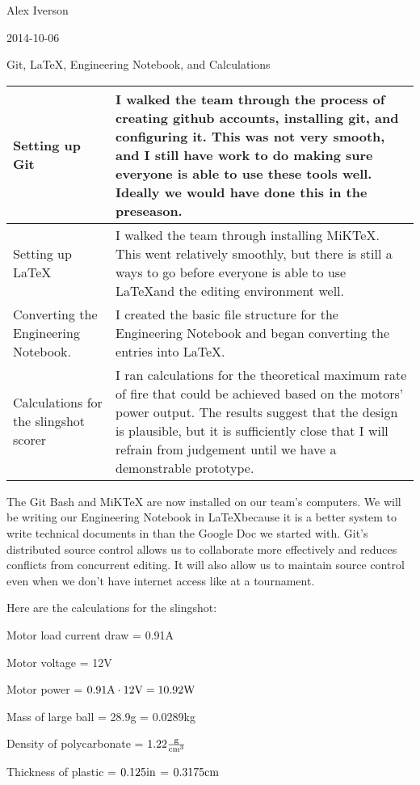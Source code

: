 Alex Iverson

2014-10-06

Git, \LaTeX, Engineering Notebook, and Calculations

\begin{tabular}{|p{5cm}|p{5cm}|}
 \hline
 Setting up Git
 &
 I walked the team through the process of creating github accounts, installing git, and configuring it. This was not very smooth, and I still have work to do making sure everyone is able to use these tools well. Ideally we would have done this in the preseason.
 \\
 \hline
 Setting up \LaTeX
 &
 I walked the team through installing MiKTeX. This went relatively smoothly, but there is still a ways to go before everyone is able to use \LaTeX and the editing environment well.
 \\
 \hline
 Converting the Engineering Notebook.
 &
 I created the basic file structure for the Engineering Notebook and began converting the entries into \LaTeX.
 \\
 \hline
 Calculations for the slingshot scorer
 &
 I ran calculations for the theoretical maximum rate of fire that could be achieved based on the motors' power output. The results suggest that the design is plausible, but it is sufficiently close that I will refrain from judgement until we have a demonstrable prototype.
\end{tabular}

The Git Bash and MiKTeX are now installed on our team's computers. We will be writing our Engineering Notebook in \LaTeX because it is a better system to write technical documents in than the Google Doc we started with. Git's distributed source control allows us to collaborate more effectively and reduces conflicts from concurrent editing. It will also allow us to maintain source control even when we don't have internet access like at a tournament.

\medskip 

Here are the calculations for the slingshot:

Motor load current draw = 0.91A

Motor voltage = 12V

Motor power = $0.91\rm{A}\cdot12\rm{V} = 10.92\rm{W}$

Mass of large ball = 28.9g = 0.0289kg

Density of polycarbonate = $1.22\frac{\rm{g}}{\rm{cm}^3}$

Thickness of plastic = $0.125\rm{in}$ = $0.3175\rm{cm}$

